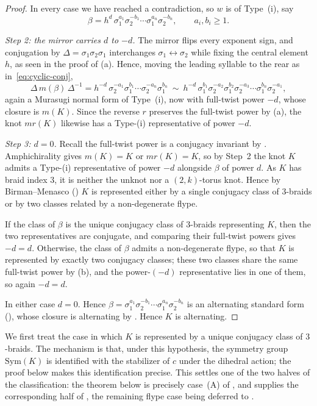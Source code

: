 \documentclass[11pt]{article}
\theoremstyle{definition}
\begin{document}
\begin{proof}
In every case we have reached a contradiction, so $w$ is of Type~(i), say
\[
\beta=h^{d}\,\sigma_1^{a_1}\sigma_2^{-b_1}\cdots\sigma_1^{a_n}\sigma_2^{-b_n},
\qquad a_i,b_i\ge1 .
\]
 
\smallskip
\noindent\emph{Step 2: the mirror carries $d$ to $-d$.}
The mirror flips every exponent sign, and conjugation by
$\Delta=\sigma_1\sigma_2\sigma_1$ interchanges $\sigma_1\leftrightarrow\sigma_2$ while
fixing the central element $h$, as seen in the proof of (a).
Hence, moving the leading syllable to the rear as in~\eqref{eq:cyclic-conj},
\[
\Delta\,m(\beta)\,\Delta^{-1}
=h^{-d}\,\sigma_2^{-a_1}\sigma_1^{b_1}\cdots\sigma_2^{-a_n}\sigma_1^{b_n}
\ \sim\ h^{-d}\,\sigma_1^{b_1}\sigma_2^{-a_2}\sigma_1^{b_2}\sigma_2^{-a_3}\cdots
\sigma_1^{b_n}\sigma_2^{-a_1},
\]
again a Murasugi normal form of Type~(i), now with full-twist power $-d$, whose closure is
$m(K)$. Since the reverse $r$ preserves the full-twist power by
(a), the knot $mr(K)$ likewise has a Type-(i) representative
of power $-d$.

\smallskip
\noindent\emph{Step 3: $d=0$.}
Recall the full-twist power is a conjugacy invariant by . Amphichirality gives $m(K)=K$ or $mr(K)=K$, so by Step~2 the knot $K$ admits a Type-(i) representative of power $-d$ alongside $\beta$ of power $d$. As $K$ has braid index $3$, it is neither the unknot nor a $(2,k)$-torus knot. Hence by Birman--Menasco () $K$ is represented either by a single conjugacy class of $3$-braids or by two classes related by a non-degenerate flype.

If the class of $\beta$ is the unique conjugacy class of $3$-braids representing $K$,
then the two representatives are conjugate, and comparing their full-twist powers gives
$-d=d$. Otherwise, the class of $\beta$ admits a non-degenerate flype, so that $K$ is
represented by exactly two conjugacy classes; these two classes share the same full-twist
power by (b), and the power-$(-d)$ representative lies in one of
them, so again $-d=d$.

\smallskip
\noindent In either case $d=0$. Hence
$\beta=\sigma_1^{a_1}\sigma_2^{-b_1}\cdots\sigma_1^{a_n}\sigma_2^{-b_n}$ is an alternating
standard form (), whose closure is alternating by
. Hence $K$ is alternating.
\end{proof}

\noindent We first treat the case in which $K$ is represented by a unique
conjugacy class of $3$-braids. The mechanism is that, under this hypothesis, the
symmetry group $\mathrm{Sym}(K)$ is identified with the stabilizer of $c$ under
the dihedral action; the proof below makes this identification precise. This
settles one of the two halves of the classification: the theorem below is
precisely case~\textup{(A)} of , and supplies the corresponding half
of , the remaining flype case being deferred to
.
\end{document}
